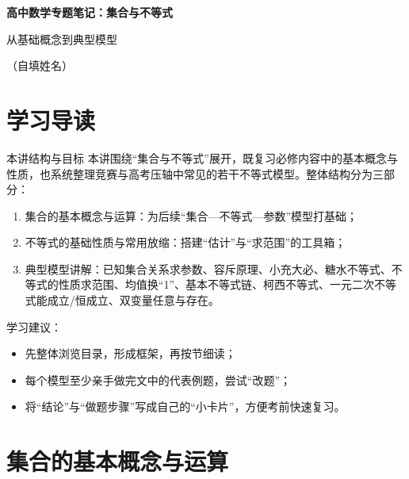 \documentclass[a4paper,11pt]{ctexart}
\renewcommand{\notetitle}{高中数学专题笔记：集合与不等式}
\renewcommand{\notesubtitle}{从基础概念到典型模型}
\renewcommand{\noteauthor}{（自填姓名）}
\begin{document}
\thispagestyle{empty}
\setcounter{page}{1}

\noindent
\begin{minipage}[t][0.7\textheight][c]{\textwidth}
  \raggedleft
  \vspace*{\fill}
  {\sffamily\bfseries\Huge\color{accent}\notetitle\par}
  \vspace{0.6em}
  {\Large\color{inkgray}\notesubtitle\par}
  \vspace{0.5em}
  {\large\color{inkgray}\noteauthor\par}
  \vspace{0.4em}
  \MathNoteVersionBlock
  \vspace*{\fill}
\end{minipage}

\clearpage
\thispagestyle{plain}
\tableofcontents
\newpage

\section{学习导读}

\begin{summarybox}{本讲结构与目标}
本讲围绕“集合与不等式”展开，既复习必修内容中的基本概念与性质，也系统整理竞赛与高考压轴中常见的若干不等式模型。整体结构分为三部分：
\begin{enumerate}
  \item 集合的基本概念与运算：为后续“集合—不等式—参数”模型打基础；
  \item 不等式的基础性质与常用放缩：搭建“估计”与“求范围”的工具箱；
  \item 典型模型讲解：已知集合关系求参数、容斥原理、小充大必、糖水不等式、不等式的性质求范围、均值换“1”、基本不等式链、柯西不等式、一元二次不等式能成立/恒成立、双变量任意与存在。
\end{enumerate}
学习建议：
\begin{itemize}
  \item 先整体浏览目录，形成框架，再按节细读；
  \item 每个模型至少亲手做完文中的代表例题，尝试“改题”；
  \item 将“结论”与“做题步骤”写成自己的“小卡片”，方便考前快速复习。
\end{itemize}
\end{summarybox}

\section{集合的基本概念与运算}
\end{document}
